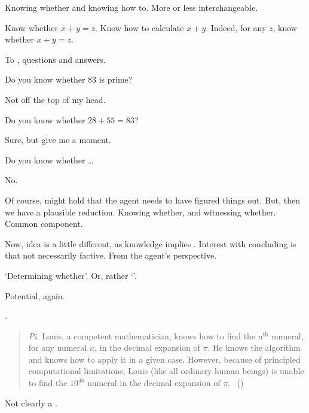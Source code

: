 \begin{note}
  Knowing whether and knowing how to.
  More or less interchangeable.

  Know whether \(x + y = z\).
  Know how to calculate \(x + y\).
  Indeed, for any \(z\), know whether \(x + y = z\).
\end{note}

\begin{note}
  To , questions and answers.

  Do you know whether \(83\) is prime?

  Not off the top of my head.

  Do you know whether \(28 + 55 = 83\)?

  Sure, but give me a moment.

  Do you know whether \dots

  No.

  Of course, might hold that the agent needs to have figured things out.
  But, then we have a plausible reduction.
  Knowing whether, and witnessing whether.
  Common component.

  Now, idea is a little different, as knowledge implies \factivity{}.
  Interest with concluding is that not necessarily factive.
  From the agent's perspective.

  `Determining whether'.
  Or, rather `'.
\end{note}

\begin{note}
  Potential, again.

  \cite{Bengson:2011th}.
  \begin{quote}
    \emph{Pi}.
    Louis, a competent mathematician, knows how to find the n\(^{\text{th}}\) numeral, for any numeral \(n\), in the decimal expansion of \(\pi\).
    He knows the algorithm and knows how to apply it in a given case.
    However, because of principled computational limitations, Louis (like all ordinary human beings) is unable to find the \(10^{46}\) numeral in the decimal expansion of \(\pi\).%
    \mbox{ }\hfill\mbox{(\citeyear[170]{Bengson:2011th})}
  \end{quote}

  Not clearly a \fc{}.
\end{note}

